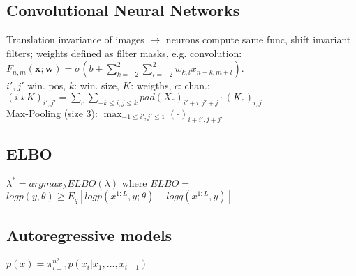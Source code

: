 \subsection*{Convolutional Neural Networks}
Translation invariance of images $\rightarrow$ neurons compute same func, shift invariant filters; weights defined as filter masks, e.g. convolution: $F_{n,m}(\mathbf{x};\mathbf{w}) = \sigma(b + \sum_{k=-2}^2\sum_{l=-2}^{2}{w_{k,l}x_{n+k,m+l}})$.\\
$i',j'$ win. pos, $k$: win. size, $K$: weigths, $c$: chan.:\\
 $(i\star K)_{i', j'} = \sum_c \sum_{-k\leq i,j \leq k} pad(X_c)_{i'+i,j'+j} \cdot(K_c)_{i,j}$\\
Max-Pooling (size 3): $\max_{-1\leq i', j' \leq 1}(\cdot)_{i+i', j+j'}$ %

\subsection*{ELBO}
$\lambda^* = argmax_\lambda ELBO(\lambda)$ where $ELBO=$\\
$log p(y,\theta) \geq E_q[log p(x^{1:L},y; \theta)-log q(x^{1:L}, y)]$

\subsection*{Autoregressive models}
$p(x)=\pi_{i=1}^{n^2} p(x_i|x_1,\dots ,x_{i-1})$